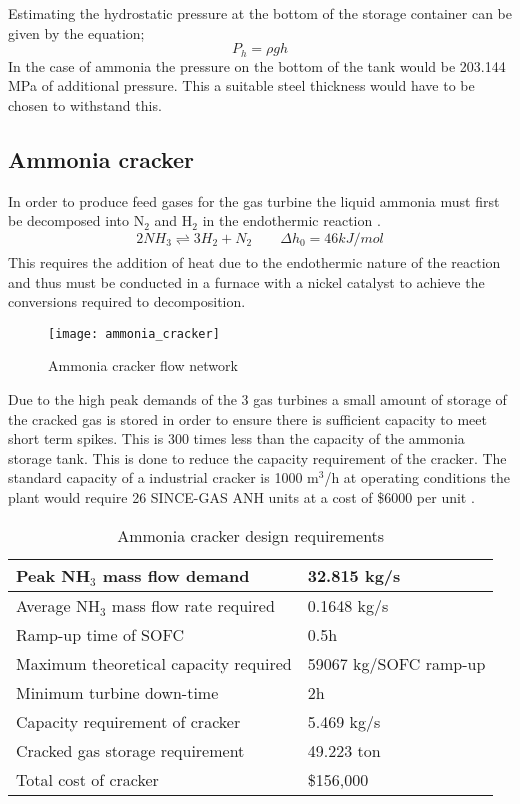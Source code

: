 {Estimating the hydrostatic pressure at the bottom of the storage container can be given by the equation;
\begin{equation}
P_h= \rho g h
\end{equation}
In the case of ammonia the pressure on the bottom of the tank would be 203.144 MPa of additional pressure. This a suitable steel thickness would have to be chosen to withstand this.
 
\subsection{Ammonia cracker}
In order to produce feed gases for the gas turbine the liquid ammonia must first be decomposed into N$_2$ and H$_2$ in the endothermic reaction \cite{Kim2012}. 
\begin{equation}
2NH_3   \underset{ }{\stackrel{ }{\rightleftharpoons}}   3H_2 + N_2 \qquad \Delta h_0 = 46 kJ/mol 
\end{equation}
This requires the addition of heat due to the endothermic nature of the reaction and thus must be conducted in a furnace with a nickel catalyst to achieve the conversions required to decomposition.

{\begin{figure}[!htbp]
		\caption{Ammonia cracker flow network}
		
		\centering
		
		\texttt{[image: ammonia\_cracker]}
	\end{figure}}

Due to the high peak demands of the 3 gas turbines a small amount of storage of the cracked gas is stored in order to ensure there is sufficient capacity to meet short term spikes. This is 300 times less than the capacity of the ammonia storage tank. This is done to reduce the capacity requirement of the cracker. The standard capacity of a industrial cracker is 1000 m$^3$/h at operating conditions the plant would require 26 SINCE-GAS ANH units  at a cost of \$6000 per unit \cite{SinceGas2018}. 
\begin{table}[!htbp]
	\begin{center}
		\caption{Ammonia cracker design requirements}
		\begin{tabular}{ |p{7cm}|p{4.5cm}|  }
			
			\hline
			Peak NH$_3$ mass flow demand & 32.815 kg/s\\
			\hline
			Average NH$_3$ mass flow rate required & 0.1648 kg/s\\
			\hline
			Ramp-up time of SOFC&  0.5h\\
			\hline
			Maximum theoretical capacity required& 59067 kg/SOFC ramp-up\\
			\hline
			Minimum turbine down-time    &2h \\
			\hline
			Capacity requirement of cracker& 5.469 kg/s\\
			\hline
			Cracked gas storage requirement & 49.223 ton \\
			\hline
			Total cost of cracker & \$156,000 \\
			\hline
		\end{tabular}
	\end{center}
\end{table}

}
